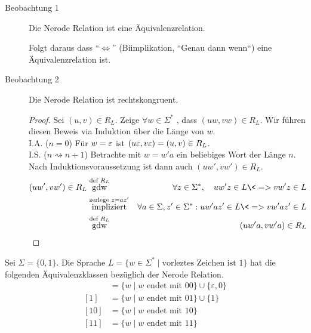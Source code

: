 \begin{description}
 \item[Beobachtung 1] Die Nerode Relation ist eine Äquivalenzrelation.
 
 Folgt daraus dass ``$\Leftrightarrow$'' (Biimplikation, ``Genau dann wenn``) eine Äquivalenzrelation ist.
 \item[Beobachtung 2] Die Nerode Relation ist rechtskongruent.
                \begin{proof}
                Sei $(u,v)\in R_L$. Zeige $\forall w\in\Sigma^*$ , dass $(uw,vw)\in R_L$.
                Wir führen diesen Beweis via Induktion über die Länge von $w$.\\
                I.A. ($n=0$) Für $w=\varepsilon$ ist $ (u\varepsilon,v\varepsilon)=(u,v)\in R_L$.\\
                I.S. ($n\rightsquigarrow n+1$) Betrachte mit $w=w'a$ ein beliebiges Wort der Länge $n$.
                Nach Induktionsvoraussetzung ist dann auch $(uw', vw') \in R_L $.
                \begin{eqnarray*}
		(uw',vw')\in R_L 
		& \stackrel{\text{def } R_L}{\text{gdw}} & \forall z\in\Sigma^*, \quad uw'z\in L \<=> vw'z\in L\\
		& \stackrel{\text{zerlege } z=az'}{\text{impliziert}} & \forall a\in \Sigma, z'\in\Sigma^*: uw'az'\in L \<=> vw'az'\in L\\
		& \stackrel{\text{def } R_L}{\text{gdw}} & (uw'a,vw'a)\in R_L
	      \end{eqnarray*}
              \end{proof}
\end{description}

\begin{Bsp}
Sei $\Sigma=\{0,1\}$. Die Sprache $L=\{w\in\Sigma^*\mid \text{vorleztes Zeichen ist } 1\}$ hat die folgenden Äquivalenzklassen bezüglich der Nerode Relation.
        \begin{align*}
        [\Eps] &= \{w\mid w \text{ endet mit } 00 \} \cup \{\varepsilon, 0\}\\
        [1] &= \{w\mid w \text{ endet mit } 01 \} \cup \{1\}\\
        [10] &= \{w\mid w \text{ endet mit } 10 \}\\
        [11] &= \{w\mid w \text{ endet mit } 11 \}
        \end{align*}
\end{Bsp}


